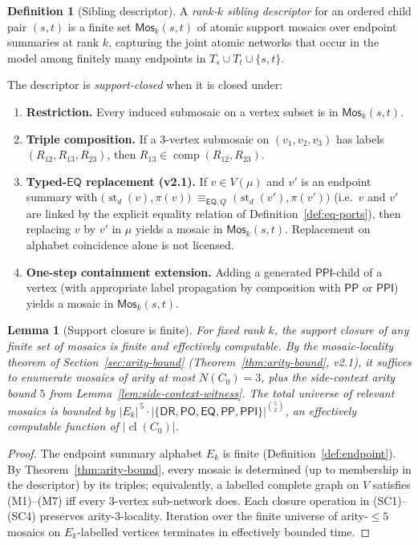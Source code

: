 \documentclass[11pt]{article}
\newtheorem{lemma}[theorem]{Lemma}
\theoremstyle{definition}
\newtheorem{definition}[theorem]{Definition}
\theoremstyle{remark}
\newcommand{\DR}{\mathsf{DR}}
\newcommand{\PO}{\mathsf{PO}}
\newcommand{\PP}{\mathsf{PP}}
\newcommand{\PPI}{\mathsf{PPI}}
\newcommand{\EQ}{\mathsf{EQ}}
\newcommand{\Base}{\{\DR,\PO,\EQ,\PP,\PPI\}}
\newcommand{\cl}{\operatorname{cl}}
\newcommand{\st}{\operatorname{st}}
\newcommand{\comp}{\operatorname{comp}}
\newcommand{\Mos}{\mathsf{Mos}}
\newcommand{\eqQ}{\equiv_{\EQ,Q}}
\begin{document}
\begin{definition}[Sibling descriptor]\label{def:descriptor}
A \emph{rank-$k$ sibling descriptor} for an ordered child pair
$(s,t)$ is a finite set $\Mos_k(s,t)$ of atomic support mosaics
over endpoint summaries at rank $k$, capturing the joint atomic
networks that occur in the model among finitely many endpoints
in $T_s \cup T_t \cup \{s, t\}$.

The descriptor is \emph{support-closed} when it is closed under:
\begin{enumerate}[label=(SC\arabic*),leftmargin=2em]
\item \textbf{Restriction.}\; Every induced submosaic on a
  vertex subset is in $\Mos_k(s,t)$.
\item \textbf{Triple composition.}\; If a 3-vertex submosaic on
  $(v_1,v_2,v_3)$ has labels $(R_{12}, R_{13}, R_{23})$, then
  $R_{13} \in \comp(R_{12},R_{23})$.
\item \textbf{Typed-$\EQ$ replacement (v2.1).}\; If
  $v\in V(\mu)$ and $v'$ is an endpoint summary with
  $\bigl(\st_d(v),\pi(v)\bigr)\;\eqQ\;\bigl(\st_d(v'),\pi(v')\bigr)$
  (i.e.\ $v$ and $v'$ are linked by the explicit equality relation
  of Definition~\ref{def:eq-ports}), then replacing $v$ by $v'$ in
  $\mu$ yields a mosaic in $\Mos_k(s,t)$.  Replacement on alphabet
  coincidence alone is not licensed.
\item \textbf{One-step containment extension.}\; Adding a generated
  $\PPI$-child of a vertex (with appropriate label propagation
  by composition with $\PP$ or $\PPI$) yields a mosaic in
  $\Mos_k(s,t)$.
\end{enumerate}
\end{definition}

\begin{lemma}[Support closure is finite]\label{lem:support-closure}
For fixed rank $k$, the support closure of any finite set of
mosaics is finite and effectively computable.  By the mosaic-locality
theorem of Section~\ref{sec:arity-bound}
(Theorem~\ref{thm:arity-bound}, v2.1), it suffices to enumerate
mosaics of arity at most $N(C_0) = 3$, plus the side-context arity
bound $5$ from Lemma~\ref{lem:side-context-witness}.  The total
universe of relevant mosaics is bounded by
$|E_k|^{\,5}\cdot|\Base|^{\binom{5}{2}}$, an effectively computable
function of $|\cl(C_0)|$.
\end{lemma}

\begin{proof}
The endpoint summary alphabet $E_k$ is finite
(Definition~\ref{def:endpoint}).  By
Theorem~\ref{thm:arity-bound}, every mosaic is determined (up to
membership in the descriptor) by its triples; equivalently, a
labelled complete graph on $V$ satisfies (M1)--(M7) iff every
3-vertex sub-network does.  Each closure operation in (SC1)--(SC4)
preserves arity-3-locality.  Iteration over the finite universe of
arity-$\le 5$ mosaics on $E_k$-labelled vertices terminates in
effectively bounded time.
\end{proof}
\end{document}
